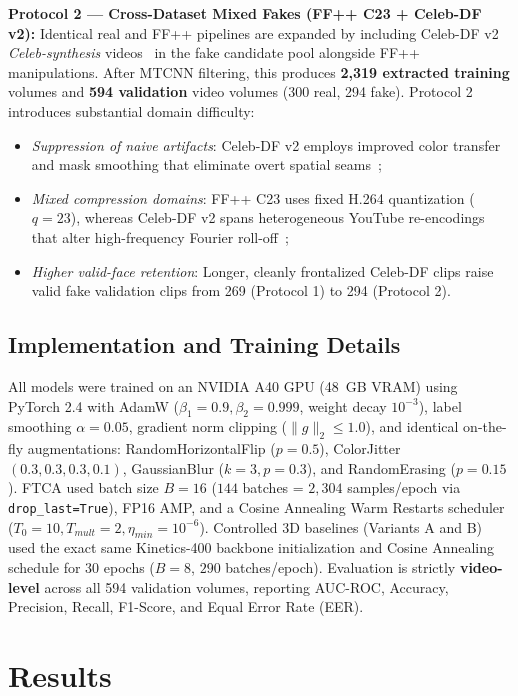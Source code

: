 \documentclass[conference,10pt]{IEEEtran}
\begin{document}
\textbf{Protocol 2 --- Cross-Dataset Mixed Fakes (FF++ C23 + Celeb-DF v2):} Identical real and FF++ pipelines are expanded by including Celeb-DF v2 \textit{Celeb-synthesis} videos~\cite{li2020celeb} in the fake candidate pool alongside FF++ manipulations. After MTCNN filtering, this produces \textbf{2,319 extracted training} volumes and \textbf{594 validation} video volumes (300 real, 294 fake). Protocol 2 introduces substantial domain difficulty:
\begin{itemize}[leftmargin=*]
    \item \textit{Suppression of naive artifacts}: Celeb-DF v2 employs improved color transfer and mask smoothing that eliminate overt spatial seams~\cite{li2020celeb};
    \item \textit{Mixed compression domains}: FF++ C23 uses fixed H.264 quantization ($q=23$), whereas Celeb-DF v2 spans heterogeneous YouTube re-encodings that alter high-frequency Fourier roll-off~\cite{frank2020leveraging};
    \item \textit{Higher valid-face retention}: Longer, cleanly frontalized Celeb-DF clips raise valid fake validation clips from 269 (Protocol 1) to 294 (Protocol 2).
\end{itemize}

\subsection{Implementation and Training Details}
All models were trained on an NVIDIA A40 GPU (48~GB VRAM) using PyTorch 2.4 with AdamW ($\beta_1=0.9, \beta_2=0.999$, weight decay $10^{-3}$), label smoothing $\alpha=0.05$, gradient norm clipping ($\|g\|_2 \le 1.0$), and identical on-the-fly augmentations: RandomHorizontalFlip ($p=0.5$), ColorJitter $(0.3,0.3,0.3,0.1)$, GaussianBlur ($k=3, p=0.3$), and RandomErasing ($p=0.15$). FTCA used batch size $B=16$ ($144$ batches = $2,304$ samples/epoch via \texttt{drop\_last=True}), FP16 AMP, and a Cosine Annealing Warm Restarts scheduler ($T_0=10, T_{mult}=2, \eta_{min}=10^{-6}$). Controlled 3D baselines (Variants A and B) used the exact same Kinetics-400 backbone initialization and Cosine Annealing schedule for 30 epochs ($B=8$, $290$ batches/epoch). Evaluation is strictly \textbf{video-level} across all 594 validation volumes, reporting AUC-ROC, Accuracy, Precision, Recall, F1-Score, and Equal Error Rate (EER).

\section{Results}
\end{document}
